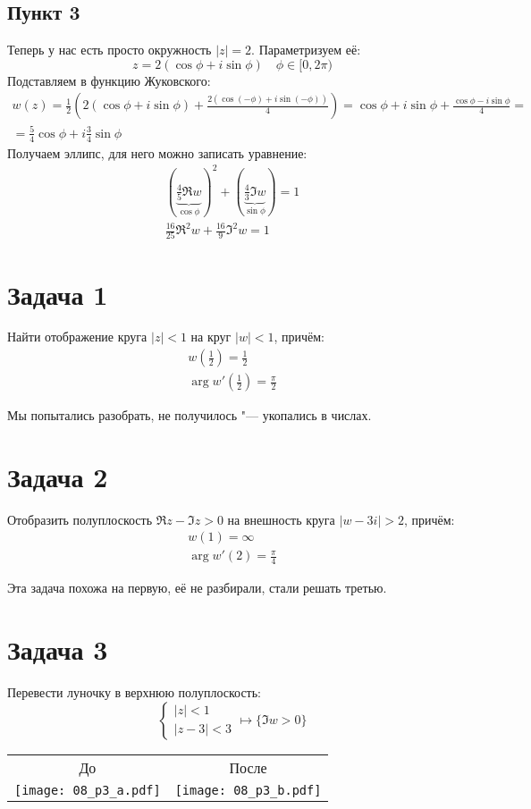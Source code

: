 	\subsection{Пункт 3}
		Теперь у нас есть просто окружность $|z|=2$.
		Параметризуем её:
		\[ z = 2(\cos \phi + i\sin \phi) \quad \phi \in [0, 2\pi) \]
		Подставляем в функцию Жуковского:
		\begin{gather*}
			w(z) =
				\frac12\left(2(\cos\phi + i\sin\phi) + \frac{2(\cos(-\phi) + i\sin(-\phi))}{4}\right) =
				\cos\phi + i\sin\phi + \frac{\cos\phi - i\sin\phi}{4} = \\
				= \frac54\cos\phi + i\frac34\sin\phi
		\end{gather*}
		Получаем эллипс, для него можно записать уравнение:
		\begin{gather*}
			\left(\underbrace{\frac45 \Re w}_{\cos\phi}\right)^2 + \left(\underbrace{\frac 43 \Im w}_{\sin\phi}\right) = 1 \\
			\frac{16}{25}\Re^2 w + \frac{16}{9}\Im^2 w = 1
		\end{gather*}

\section{Задача 1}
	Найти отображение круга $|z|<1$ на круг $|w|<1$, причём:
	\begin{gather*}
		w\left(\frac 12\right) = \frac12 \\
		\arg w'\left(\frac 12\right) = \frac \pi 2
	\end{gather*}

	Мы попытались разобрать, не получилось "--- укопались в числах.

\section{Задача 2}
	Отобразить полуплоскость $\Re z - \Im z > 0$ на внешность круга $|w-3i|>2$, причём:
	\begin{gather*}
		w(1) = \infty \\
		\arg w'(2) = \frac \pi 4
	\end{gather*}

	Эта задача похожа на первую, её не разбирали, стали решать третью.

\section{Задача 3}
	Перевести луночку в верхнюю полуплоскость:
	\[
		\begin{cases}
			|z| < 1 \\
			|z - 3| < 3
		\end{cases}
		\mapsto
		\{ \Im w > 0 \}
	\]
	\begin{center}
		\begin{tabular}{cc}
		До & После \\
		\texttt{[image: 08\_p3\_a.pdf]} & \texttt{[image: 08\_p3\_b.pdf]} \\
		\end{tabular}
	\end{center}

